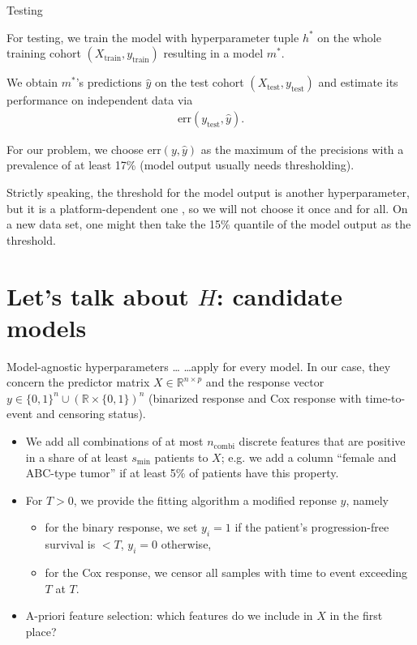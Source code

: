 \documentclass[10pt, aspectratio=169]{beamer}
\def\RR{\mathbb{R}}
\begin{document}
\begin{frame}{Testing}

  For testing, we train the model with hyperparameter tuple $h^*$ on the whole
  training cohort $(X_\text{train}, y_{\text{train}})$ resulting in a model $m^*$.

  We obtain $m^*$'s predictions $\hat{y}$ on the test cohort 
  $(X_{\text{test}}, y_{\text{test}})$ and estimate 
  its performance on independent data via
  \begin{align*}
    \text{err}(y_{\text{test}}, \hat{y}).
  \end{align*}

  \pause
  For our problem, we choose $\text{err}(y, \hat{y})$ as the maximum of the precisions
  with a prevalence of at least 17\% (model output usually needs thresholding).

  Strictly speaking, the threshold for the model output is another hyperparameter, 
  but it is a platform-dependent one \citep{transplatform17}, so we will not 
  choose it once and for all. On a new data set, one might then take the 15\% 
  quantile of the model output as the threshold.
\end{frame}

\section{Let's talk about $H$: candidate models}

\begin{frame}{Model-agnostic hyperparameters \ldots}
  \ldots apply for every model. In our case, they concern the predictor matrix 
  $X \in \RR^{n \times p}$ and the response vector $y \in \{ 0, 1 \}^n \cup 
  (\RR \times \{0, 1 \})^n$ (binarized response and Cox response with time-to-event 
  and censoring status).

  \begin{itemize}
    \item We add all combinations of at most $n_{\text{combi}}$ discrete features 
      that are positive in a share of at least $s_{\text{min}}$ patients to $X$; e.g. 
      we add a column ``female and ABC-type tumor'' if at least 5\% of patients 
      have this property.
    \pause
    \item For $T > 0$, we provide the fitting algorithm a modified reponse $y$, namely
      \begin{itemize}
        \item for the binary response, we set $y_i = 1$ if the patient's progression-free 
          survival is $< T$, $y_i = 0$ otherwise,
        \item for the Cox response, we censor all samples with time to event 
          exceeding $T$ at $T$.
      \end{itemize}
    \pause
    \item A-priori feature selection: which features do we include in $X$ in the 
      first place?
  \end{itemize}
\end{frame}
\end{document}
